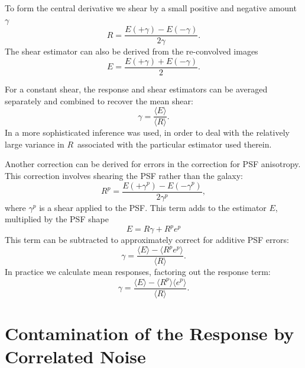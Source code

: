 \documentclass[usegraphicx,usenatbib]{mn2e}
\newcommand{\mcalR}{$R$}
\newcommand{\mcalRpsf}{$R^{p}$}
\begin{document}
To form the central derivative we shear by a small positive and negative
amount $\gamma$
\begin{equation} \label{eq:Rnum}
    R = \frac{E(+\gamma) - E(-\gamma)}{2 \gamma}.
\end{equation}
The shear estimator can also be derived from the re-convolved
images
\begin{equation} \label{eq:estimator}
    E = \frac{E(+\gamma) + E(-\gamma)}{2}.
\end{equation}

For a constant shear, the response and shear estimators can be averaged
separately and combined to recover the mean shear:
\begin{equation}
    \gamma = \frac{ \langle E \rangle }{\langle \mbox{\mcalR} \rangle}.
\end{equation}
In \cite{HuffMcal} a more sophisticated inference was used, in order to deal
with the relatively large variance in \mcalR\ associated with the particular
estimator used therein.

Another correction can be derived for errors in the correction for 
PSF anisotropy.  This correction involves shearing the PSF rather
than the galaxy:
\begin{equation}
    \mbox{\mcalRpsf} = \frac{E(+\gamma^{p}) - E(-\gamma^{p})}{2 \gamma^{p}},
\end{equation}
where $\gamma^{p}$ is a shear applied to the PSF.  This
term adds to the estimator $E$, multiplied by the PSF shape
\begin{equation}
    E = \mbox{\mcalR} \gamma + \mbox{\mcalRpsf} e^{p} 
\end{equation}
This term can be subtracted to approximately correct for additive PSF errors:
\begin{equation}
    \gamma = \frac{ \langle E \rangle - \langle \mbox{\mcalRpsf} e^{p} \rangle }{\langle \mbox{\mcalR} \rangle}.
\end{equation}
In practice we calculate mean responses, factoring out the response term:
\begin{equation}
    \gamma = \frac{ \langle E \rangle - 
            \langle \mbox{\mcalRpsf}\rangle \langle e^{p} \rangle }{\langle \mbox{\mcalR} \rangle}.
\end{equation}


\section{Contamination of the Response by Correlated Noise} \label{sec:contam}
\end{document}
